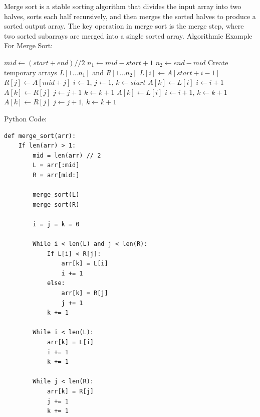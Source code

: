 \documentclass[12pt]{book} %
\begin{document}
Merge sort is a stable sorting algorithm that divides the input array into two halves, sorts each half recursively, and then merges the sorted halves to produce a sorted output array. The key operation in merge sort is the merge step, where two sorted subarrays are merged into a single sorted array.
Algorithmic Example For Merge Sort:
     \FloatBarrier %
\begin{algorithm}
\caption{Merge Sort}
\begin{algorithmic}[1]
        \State $mid \gets (start + end) // 2$
        \State {}
        \State {}
        \State {}
    \EndIf
\EndFunction
\FloatBarrier %
    \State $n_1 \gets mid - start + 1$
    \State $n_2 \gets end - mid$
    \State Create temporary arrays $L[1 \dots n_1]$ and $R[1 \dots n_2]$
        \State $L[i] \gets A[start + i - 1]$
    \EndFor
        \State $R[j] \gets A[mid + j]$
    \EndFor
    \State $i \gets 1$, $j \gets 1$, $k \gets start$
            \State $A[k] \gets L[i]$
            \State $i \gets i + 1$
        \Else
            \State $A[k] \gets R[j]$
            \State $j \gets j + 1$
        \EndIf
        \State $k \gets k + 1$
    \EndWhile
        \State $A[k] \gets L[i]$
        \State $i \gets i + 1$, $k \gets k + 1$
    \EndWhile
        \State $A[k] \gets R[j]$
        \State $j \gets j + 1$, $k \gets k + 1$
    \EndWhile
\EndFunction
\end{algorithmic}
\end{algorithm}
\FloatBarrier %
Python Code:
\FloatBarrier %
\begin{verbatim}
def merge_sort(arr):
    If len(arr) > 1:
        mid = len(arr) // 2
        L = arr[:mid]
        R = arr[mid:]

        merge_sort(L)
        merge_sort(R)

        i = j = k = 0

        While i < len(L) and j < len(R):
            If L[i] < R[j]:
                arr[k] = L[i]
                i += 1
            else:
                arr[k] = R[j]
                j += 1
            k += 1

        While i < len(L):
            arr[k] = L[i]
            i += 1
            k += 1

        While j < len(R):
            arr[k] = R[j]
            j += 1
            k += 1
\end{verbatim}
    \FloatBarrier %
\end{document}

